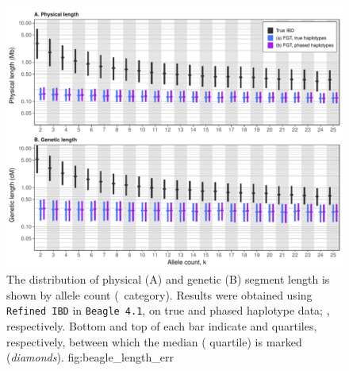 

\begin{figure}[!htb]
\includegraphics[width=\textwidth]{./img/ch4/beagle_length_err}
{The distribution of physical (A) and genetic (B) segment length is shown by allele count (\fk{}~category).
Results were obtained using \texttt{Refined\,IBD} in \texttt{Beagle\,4.1}, on true and phased haplotype data; \ie {}, respectively.
Bottom and top of each bar indicate  and  quartiles, respectively, between which the median ( quartile) is marked (\emph{diamonds}).\CorrectLabel}
{fig:beagle_length_err}
\end{figure}
